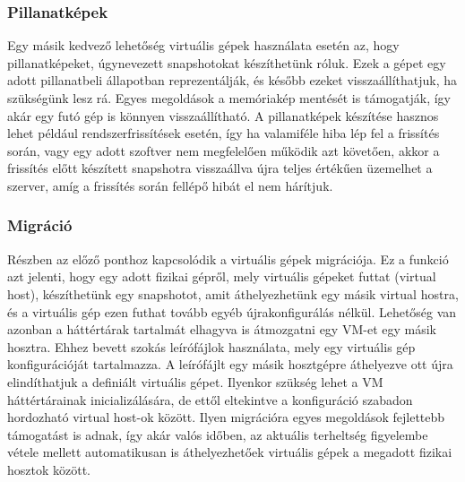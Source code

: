 \subsubsection{Pillanatképek}
Egy másik kedvező lehetőség virtuális gépek használata esetén az, hogy pillanatképeket, úgynevezett snapshotokat készíthetünk róluk. Ezek a gépet egy adott pillanatbeli állapotban reprezentálják, és később ezeket visszaállíthatjuk, ha szükségünk lesz rá. Egyes megoldások a memóriakép mentését is támogatják, így akár egy futó gép is könnyen visszaállítható. A pillanatképek készítése hasznos lehet például rendszerfrissítések esetén, így ha valamiféle hiba lép fel a frissítés során, vagy egy adott szoftver nem megfelelően működik azt követően, akkor a frissítés előtt készített snapshotra visszaállva újra teljes értékűen üzemelhet a szerver, amíg a frissítés során fellépő hibát el nem hárítjuk.

\subsubsection{Migráció}
Részben az előző ponthoz kapcsolódik a virtuális gépek migrációja. Ez a funkció azt jelenti, hogy egy adott fizikai gépről, mely virtuális gépeket futtat (virtual host), készíthetünk egy snapshotot, amit áthelyezhetünk egy másik virtual hostra, és a virtuális gép ezen futhat tovább egyéb újrakonfigurálás nélkül.
Lehetőség van azonban a háttértárak tartalmát elhagyva is átmozgatni egy VM-et egy másik hosztra. Ehhez bevett szokás leírófájlok használata, mely egy virtuális gép konfigurációját tartalmazza. A leírófájlt egy másik hosztgépre áthelyezve ott újra elindíthatjuk a definiált virtuális gépet. Ilyenkor szükség lehet a VM háttértárainak inicializálására, de ettől eltekintve a konfiguráció szabadon hordozható virtual host-ok között. Ilyen migrációra egyes megoldások fejlettebb támogatást is adnak, így akár valós időben, az aktuális terheltség figyelembe vétele mellett automatikusan is áthelyezhetőek virtuális gépek a megadott fizikai hosztok között.

